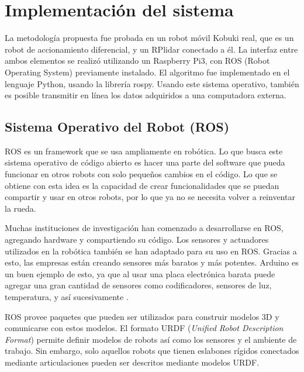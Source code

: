 
\section{Implementaci\'on del sistema}

La metodología propuesta fue probada en un robot móvil Kobuki real, que es un robot de 
accionamiento diferencial, y un RPlidar conectado a él. La interfaz entre ambos elementos 
se realizó utilizando un Raspberry Pi3, con ROS (Robot Operating System) previamente instalado.
El algoritmo fue implementado en el lenguaje Python, usando la librería rospy. Usando este sistema 
operativo, también es posible transmitir en línea los datos adquiridos a una computadora 
externa. 

\subsection{Sistema Operativo del Robot (ROS)}
ROS es un framework que se usa ampliamente en rob\'otica. Lo que busca este sistema 
operativo de código abierto es hacer una parte del software que pueda funcionar en 
otros robots con solo pequeños cambios en el código. Lo que se obtiene con esta idea 
es la capacidad de crear funcionalidades que se puedan compartir y usar en otros robots, por 
lo que ya no se necesita volver a reinventar la rueda.

Muchas instituciones de investigaci\'on han comenzado a desarrollarse en 
ROS, agregando hardware y compartiendo su c\'odigo. Los sensores y actuadores 
utilizados en la rob\'otica tambi\'en se han adaptado para su uso en ROS. Gracias 
a esto, las empresas est\'an creando sensores m\'as baratos y m\'as potentes. Arduino 
es un buen ejemplo de esto, ya que al usar una placa electr\'onica barata puede 
agregar una gran cantidad de sensores como codificadores, sensores de luz, 
temperatura, y as\'i sucesivamente \cite{rosIntroduction}.

ROS provee paquetes que pueden ser utilizados para construir modelos 3D y comunicarse 
con estos modelos. El formato URDF (\textit{Unified Robot Description Format}) permite 
definir modelos de robots así como los sensores y el ambiente de trabajo. Sin embargo, solo 
aquellos robots que tienen eslabones rígidos conectados mediante articulaciones pueden ser 
descritos mediante modelos URDF.

